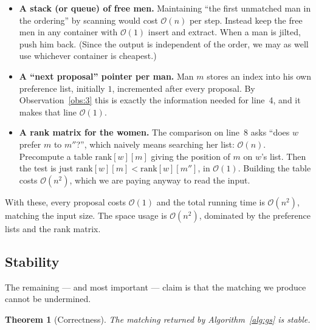 \documentclass[11pt,a4paper]{article}
\theoremstyle{plain}
\newtheorem{theorem}{Theorem}[section]
\theoremstyle{definition}
\theoremstyle{remark}
\newcommand{\bigoh}[1]{\mathcal{O}\!\left(#1\right)}
\begin{document}
\begin{itemize}
  \item \textbf{A stack (or queue) of free men.} Maintaining ``the first
        unmatched man in the ordering'' by scanning would cost $\bigoh{n}$ per
        step. Instead keep the free men in any container with $\bigoh{1}$
        insert and extract. When a man is jilted, push him back. (Since the
        output is independent of the order, we may as well use whichever
        container is cheapest.)
  \item \textbf{A ``next proposal'' pointer per man.} Man $m$ stores an index
        into his own preference list, initially $1$, incremented after every
        proposal. By Observation~\ref{obs:3} this is exactly the information
        needed for line~4, and it makes that line $\bigoh{1}$.
  \item \textbf{A rank matrix for the women.} The comparison on line~8 asks
        ``does $w$ prefer $m$ to $m''$?'', which naively means searching her
        list: $\bigoh{n}$. Precompute a table $\mathrm{rank}[w][m]$ giving the
        position of $m$ on $w$'s list. Then the test is just
        $\mathrm{rank}[w][m] < \mathrm{rank}[w][m'']$, in $\bigoh{1}$.
        Building the table costs $\bigoh{n^2}$, which we are paying anyway to
        read the input.
\end{itemize}

With these, every proposal costs $\bigoh{1}$ and the total running time is
$\bigoh{n^2}$, matching the input size. The space usage is $\bigoh{n^2}$,
dominated by the preference lists and the rank matrix.

\subsection{Stability}

The remaining --- and most important --- claim is that the matching we produce
cannot be undermined.

\begin{theorem}[Correctness]\label{thm:stable}
The matching returned by Algorithm~\ref{alg:gs} is stable.
\end{theorem}
\end{document}
